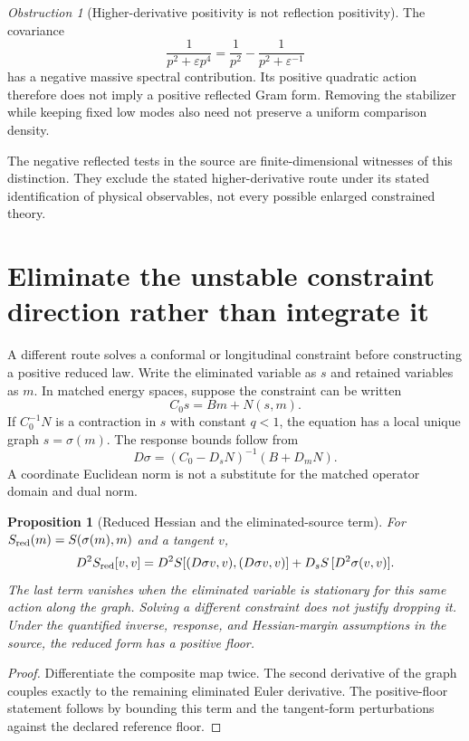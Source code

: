 \documentclass[11pt,a4paper,oneside]{book}
\theoremstyle{plain}
\newtheorem{proposition}[theorem]{Proposition}
\theoremstyle{definition}
\theoremstyle{remark}
\newtheorem{obstruction}[theorem]{Obstruction}
\begin{document}
\begin{obstruction}[Higher-derivative positivity is not reflection positivity]
\label{obs:higher-derivative}
The covariance
\begin{equation}
 \frac1{p^2+\varepsilon p^4}
 =\frac1{p^2}-\frac1{p^2+\varepsilon^{-1}}
 \label{eq:hd-cov}
\end{equation}
has a negative massive spectral contribution. Its positive quadratic action therefore does not imply a positive reflected Gram form. Removing the stabilizer while keeping fixed low modes also need not preserve a uniform comparison density.
\end{obstruction}
\cite{R9,R19}
The negative reflected tests in the source are finite-dimensional witnesses of this distinction. They exclude the stated higher-derivative route under its stated identification of physical observables, not every possible enlarged constrained theory.

\section{Eliminate the unstable constraint direction rather than integrate it}
A different route solves a conformal or longitudinal constraint before constructing a positive reduced law. Write the eliminated variable as $s$ and retained variables as $m$. In matched energy spaces, suppose the constraint can be written
\begin{equation}
 C_0s=Bm+N(s,m).
 \label{eq:constraint-graph}
\end{equation}
If $C_0^{-1}N$ is a contraction in $s$ with constant $q<1$, the equation has a local unique graph $s=\sigma(m)$. The response bounds follow from
\begin{equation}
 D\sigma=(C_0-D_sN)^{-1}(B+D_mN).
 \label{eq:constraint-response}
\end{equation}
A coordinate Euclidean norm is not a substitute for the matched operator domain and dual norm. \cite{R9,R10}

\begin{proposition}[Reduced Hessian and the eliminated-source term]
\label{prop:reduced-hessian}
For $S_{\rm red}(m)=S(\sigma(m),m)$ and a tangent $v$,
\begin{equation}
 D^2S_{\rm red}[v,v]
 =D^2S[(D\sigma v,v),(D\sigma v,v)]
   +D_sS\,[D^2\sigma(v,v)].
 \label{eq:reduced-hessian}
\end{equation}
The last term vanishes when the eliminated variable is stationary for this same action along the graph. Solving a different constraint does not justify dropping it. Under the quantified inverse, response, and Hessian-margin assumptions in the source, the reduced form has a positive floor.
\end{proposition}
\begin{proof}
Differentiate the composite map twice. The second derivative of the graph couples exactly to the remaining eliminated Euler derivative. The positive-floor statement follows by bounding this term and the tangent-form perturbations against the declared reference floor.
\end{proof}
\cite{R10}
\end{document}
